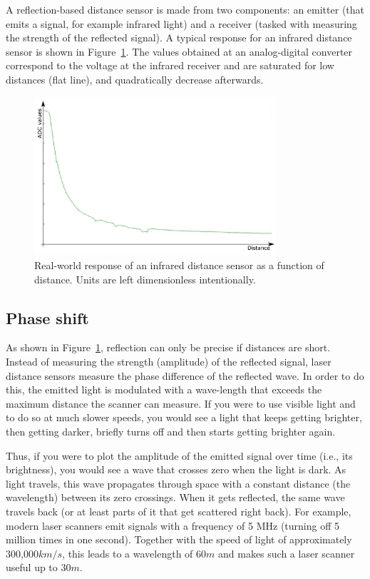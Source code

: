 A reflection-based distance sensor is made from two components: an emitter (that emits a signal, for example infrared light) and a receiver (tasked with measuring the strength of the reflected signal). A typical response for an infrared distance sensor is shown in Figure~\ref{fig:epuckir}. The values obtained at an analog-digital converter correspond to the voltage at the infrared receiver and are saturated for low distances (flat line), and quadratically decrease afterwards.


\begin{figure}
	\centering
		\includegraphics[width=0.8\textwidth]{figs/epuckirsensor.png}
	\caption{Real-world response of an infrared distance sensor as a function of distance. Units are left dimensionless intentionally.}
	\label{fig:epuckir}
\end{figure}


\subsection{Phase shift}\label{sec:phaseshiftsensors}

As shown in Figure~\ref{fig:epuckir}, reflection can only be precise if distances are short. Instead of measuring the strength (amplitude) of the reflected signal, laser distance sensors measure the phase difference of the reflected wave. In order to do this, the emitted light is modulated with a wave-length that exceeds the maximum distance the scanner can measure.
If you were to use visible light and to do so at much slower speeds, you would see a light that keeps getting brighter, then getting darker, briefly turns off and then starts getting brighter again.

Thus, if you were to plot the amplitude of the emitted signal over time (i.e., its brightness), you would see a wave that crosses zero when the light is dark.
As light travels, this wave propagates through space with a constant distance (the wavelength) between its zero crossings. When it gets reflected, the same wave travels back (or at least parts of it that get scattered right back). For example, modern laser scanners emit signals with a frequency of 5 MHz (turning off 5 million times in one second). Together with the speed of light of approximately 300,000$km/s$, this leads to a wavelength of $60m$ and makes such a laser scanner useful up to $30m$.

